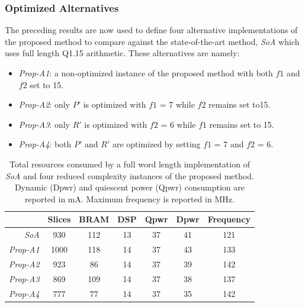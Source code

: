 		\subsubsection{Optimized Alternatives}

The preceding results are now used to define four alternative implementations of the proposed method to  compare against the state-of-the-art method, \textit{SoA} which uses full length Q1.15 arithmetic. These alternatives are namely:
\begin{itemize}
\item \textit{Prop-A1}: a non-optimized instance of the proposed method with both $f1$ and $f2$ set to 15.
\item \textit{Prop-A2}: only $P'$ is optimized with $f1$ = 7 while $f2$ remains set to15.
\item \textit{Prop-A3}: only $R'$ is optimized with  $f2$ = 6 while $f1$ remains set to 15.
\item \textit{Prop-A4}: both $P'$ and $R'$ are optimized by setting $f1$ = 7 and $f2$ = 6.
\end{itemize}


\begin{table}[h]
	\centering
	\caption{ Total resources consumed by a full word length implementation of \textit{SoA} and four reduced complexity instances of the proposed method. Dynamic (Dpwr) and quiescent power (Qpwr) consumption are reported in mA. Maximum frequency is reported in MHz.}
	\label{tab:Int_Imp_Rpt}
	\begin{tabular}{r|c|c|c|c|c|c}
        \hline \hline
    			 {}	&  {Slices} &  {BRAM} &  {DSP}&  {Qpwr}& {Dpwr}& {Frequency}\\
	\hline
		\textit{SoA} 	& 930 	& 112 	& 13	& 37	& 41 & 121 \\
		\textit{Prop-A1}	& 1000 	& 118	& 14 	& 37 	& 43 & 133 \\
		\textit{Prop-A2}	& 923 	& 86	& 14 	& 37	& 39 & 142 \\
		\textit{Prop-A3}	& 869  	& 109  	& 14	& 37 	& 38 & 137 \\
		\textit{Prop-A4}	& 777  	& 77  	& 14	& 37 	& 35 & 142 \\
	\hline \hline
    \end{tabular}
\end{table}


